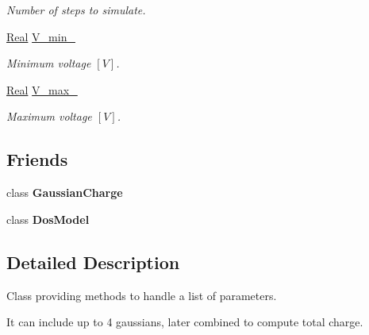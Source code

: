 \begin{DoxyCompactItemize}
\begin{DoxyCompactList}\small\item\em Number of steps to simulate. \end{DoxyCompactList}\item 
\hypertarget{classParamList_a6212d80113c5445355b66fef1e6928eb}{\hyperlink{typedefs_8h_a060b837c3b4486ee35317744156f3da2}{Real} \hyperlink{classParamList_a6212d80113c5445355b66fef1e6928eb}{V\-\_\-min\-\_\-}}\label{classParamList_a6212d80113c5445355b66fef1e6928eb}

\begin{DoxyCompactList}\small\item\em Minimum voltage $ \left[ V \right] $. \end{DoxyCompactList}\item 
\hypertarget{classParamList_afc5968e07015183cc569c8c286613cda}{\hyperlink{typedefs_8h_a060b837c3b4486ee35317744156f3da2}{Real} \hyperlink{classParamList_afc5968e07015183cc569c8c286613cda}{V\-\_\-max\-\_\-}}\label{classParamList_afc5968e07015183cc569c8c286613cda}

\begin{DoxyCompactList}\small\item\em Maximum voltage $ \left[ V \right] $. \end{DoxyCompactList}\end{DoxyCompactItemize}
\subsection*{Friends}
\begin{DoxyCompactItemize}
\item 
\hypertarget{classParamList_a6be33a81953be5c0377a00dec7d5b1d3}{class {\bfseries Gaussian\-Charge}}\label{classParamList_a6be33a81953be5c0377a00dec7d5b1d3}

\item 
\hypertarget{classParamList_a0200762a1ea62a10cc0aed231c12f279}{class {\bfseries Dos\-Model}}\label{classParamList_a0200762a1ea62a10cc0aed231c12f279}

\end{DoxyCompactItemize}


\subsection{Detailed Description}
Class providing methods to handle a list of parameters. 

It can include up to 4 gaussians, later combined to compute total charge. 

